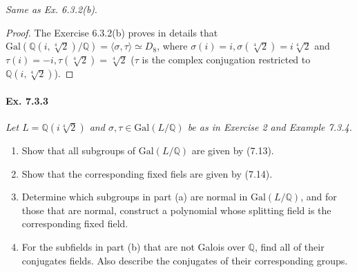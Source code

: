 \documentclass[11pt,a4paper]{article}
\newcommand{\be} {\begin{enumerate}}
\newcommand{\ee} {\end{enumerate}}
\newcommand{\Q}{\mathbb{Q}}
\newcommand{\Gal}{\mathrm{Gal}}
\begin{document}
{\it Same as Ex. 6.3.2(b)}.

\begin{proof}
The Exercise 6.3.2(b) proves in details that $\Gal(\Q(i,\sqrt[4]{2})/\Q) = \langle \sigma, \tau\rangle \simeq D_8$, where $\sigma(i) = i, \sigma(\sqrt[4]{2}) = i \sqrt[4]{2}$ and $\tau(i) = -i, \tau(\sqrt[4]{2}) = \sqrt[4]{2}$ ($\tau$ is the complex conjugation restricted to $\Q(i,\sqrt[4]{2})$).
\end{proof}

\paragraph{Ex. 7.3.3}

{\it Let $L = \Q(i\sqrt[4]{2})$ and $\sigma, \tau \in \Gal(L/\Q)$ be as in Exercise 2 and Example 7.3.4.
\be
\item[(a)] Show that all subgroups of $\Gal(L/\Q)$ are given by (7.13).
\item[(b)] Show that the corresponding fixed fiels are given by (7.14).
\item[(c)] Determine which subgroups in part (a) are normal in $\Gal(L/\Q)$, and for those that are normal, construct a polynomial whose splitting field is the corresponding fixed field.
\item[(d)] For the subfields in part (b) that are not Galois over $\Q$, find all of their conjugates fields. Also describe the conjugates of their corresponding groups.
\ee
}
\end{document}
